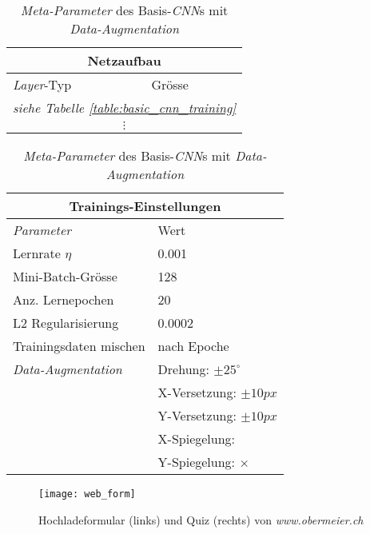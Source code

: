 \begin{table}[!htb]
	\def\arraystretch{1.4}
	\centering
	\begin{subtable}[t]{.5\linewidth}
		\begin{tabular}[t]{l | l }
			\multicolumn{2}{c}{\textbf{Netzaufbau}}\\
			\hline
			\textit{Layer}-Typ \qquad\quad\quad& Grösse\\
			\hline
			\hline
			\multicolumn{2}{c}{\qquad\qquad\qquad\quad\textit{siehe Tabelle \ref{table:basic_cnn_training}}\qquad\qquad\qquad\qquad}\\
			\multicolumn{2}{c}{$\vdots$}\\
			\hline
		\end{tabular}
	\end{subtable}%
	\begin{subtable}[t]{.5\linewidth}
		\begin{tabular}[t]{l | l }
			\multicolumn{2}{c}{\textbf{Trainings-Einstellungen}}\\
			\hline
			\textit{Parameter} & Wert\\
			\hline
			\hline
			Lernrate $\eta$ & 0.001\\
			Mini-Batch-Grösse & 128\\
			Anz. Lernepochen & 20\\
			L2 Regularisierung & 0.0002\\
			Trainingsdaten mischen& nach Epoche\\
			\textit{Data-Augmentation}& Drehung: $\pm25^{\circ}$ \\
			& X-Versetzung: $\pm10px$ \\
			& Y-Versetzung: $\pm10px$ \\
			& X-Spiegelung: \checkmark \\
			& Y-Spiegelung: $\times$ \\
		\end{tabular}
	\end{subtable} 
	\caption{\textit{Meta-Parameter} des Basis-\textit{CNN}s mit \textit{Data-Augmentation}}
	\label{table:dataaug_training}
\end{table}



\begin{figure}[h]
	\centering
	\texttt{[image: web\_form]}
	\caption[\textit{\textit{Hochladeformular \& Quiz}}]{Hochladeformular (links) und Quiz (rechts) von \textit{www.obermeier.ch}}
	\label{img:webpage}
\end{figure}